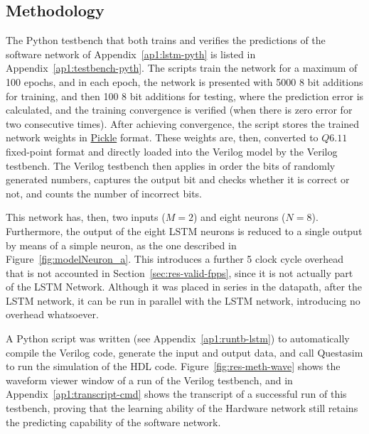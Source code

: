 \subsection{Methodology}\label{sec:res-meth}
The Python testbench that both trains and verifies the predictions of the software network of Appendix~\ref{ap1:lstm-pyth} is listed in Appendix~\ref{ap1:testbench-pyth}. The scripts train the
network for a maximum of 100 epochs, and in each epoch, the network is presented with 5000 8 bit additions for training, and then 100 8 bit additions for testing, where the prediction error is
calculated, and the training convergence is verified (when there is zero error for two consecutive times). After achieving convergence, the script stores the trained network weights in
\href{https://docs.python.org/3/library/pickle.html}{Pickle} format. These weights are, then, converted to $Q6.11$ fixed-point format and directly loaded into the Verilog model by the Verilog
testbench. The Verilog testbench then applies in order the bits of randomly generated numbers, captures the output bit and checks
whether it is correct or not, and counts the number of incorrect bits.

This network has, then, two inputs ($M=2$) and eight neurons ($N=8$). Furthermore, the output of the eight LSTM neurons is reduced to a single output by means of a simple neuron, as the one
described in Figure~\ref{fig:modelNeuron_a}. This introduces a further 5 clock cycle overhead that is not accounted in Section~\ref{sec:res-valid-fpps}, since it is not actually part of the
LSTM Network. Although it was placed in series in the datapath, after the LSTM network, it can be run in parallel with the LSTM network, introducing no overhead whatsoever.

A Python script was written (see Appendix~\ref{ap1:runtb-lstm}) to automatically compile the Verilog code, generate the input and output data, and call Questasim to run the simulation of the
HDL code. Figure~\ref{fig:res-meth-wave} shows the waveform viewer window of a run of the Verilog testbench, and in Appendix~\ref{ap1:transcript-cmd} shows the transcript of a successful
run of this testbench, proving that the learning ability of the Hardware network still retains the predicting capability of the software network.

